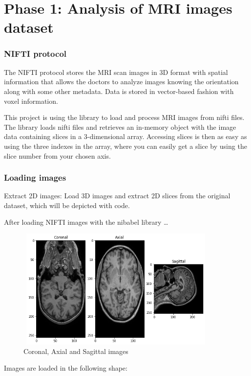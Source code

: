 \section{Phase 1: Analysis of MRI images dataset}

\subsubsection*{NIFTI protocol}

The NIFTI protocol stores the MRI scan images in 3D format with spatial information that allows the doctors to analyze images knowing the orientation along with some other metadata. Data is stored in vector-based fashion with voxel information.

This project is using the \cite{nibabel} library to load and process MRI images from nifti files. The library loads nifti files and retrieves an in-memory object with the image data containing slices in a 3-dimensional array. Accessing slices is then as easy as using the three indexes in the array, where you can easily get a slice by using the slice number from your chosen axis.

\subsubsection*{Loading images}
Extract 2D images: Load 3D images and extract 2D slices from the original dataset, which will be depicted with code.

After loading NIFTI images with the nibabel library \dots

\begin{figure}[ht]
    \centering
    \includegraphics[width = 10cm, height = 6cm]{images/3-axis.png}
    \caption[]{Coronal, Axial and Sagittal images}
    \label{fig:3-axis}
\end{figure}

Images are loaded in the following shape:


